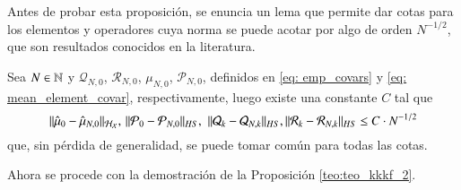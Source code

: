 Antes de probar esta proposición, se enuncia un lema que permite dar cotas para los elementos y operadores cuya norma se puede acotar por algo de orden $N^{-1/2}$, que son resultados conocidos en la literatura.
\begin{lema} Sea $N \in \mathbb{N}$ y $\mathcal{Q}_{N,0}$, $\mathcal{R}_{N,0}$, $\mu_{N,0}$, $\mathcal{P}_{N,0}$, definidos en \ref{eq: emp_covars} y \ref{eq: mean_element_covar}, respectivamente, luego existe una constante $C$ tal que
	\begin{equation*}
		\| \hat{\mu}_0 - \hat{\mu}_{N,0} \|_{\mathcal{H}_{\mathcal{X}}}, \, \|  \mathcal{P}_{0} -  \mathcal{P}_{N,0}\|_{HS}, \, \, \| \mathcal{Q}_{k} - \mathcal{Q}_{N, k} \|_{HS}, \| \mathcal{R}_{k} - \mathcal{R}_{N, k} \|_{HS} \leq C\cdot N^{-1/2}
	\end{equation*}
	que, sin pérdida de generalidad, se puede tomar común para todas las cotas.
	\label{lema:oper_sqrt_N}
\end{lema}
Ahora se procede con la demostración de la Proposición \ref{teo:teo_kkkf_2}.
